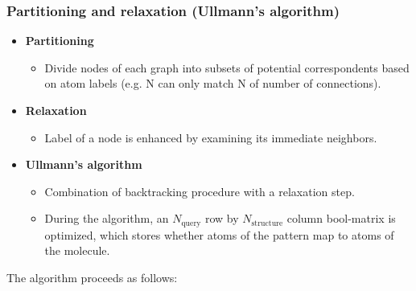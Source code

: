 \subsubsection{Partitioning and relaxation (Ullmann's algorithm)}

\begin{itemize}
    \item \textbf{Partitioning}
    \begin{itemize}
        \item Divide nodes of each graph into subsets of potential correspondents based on atom labels (e.g. N can only match N of number of connections).
    \end{itemize}
    \item \textbf{Relaxation}
    \begin{itemize}
        \item Label of a node is enhanced by examining its immediate neighbors.
    \end{itemize}
    \item \textbf{Ullmann's algorithm}
    \begin{itemize}
        \item Combination of backtracking procedure with a relaxation step.
        \item During the algorithm, an $N_\mathrm{query}$ row by $N_\mathrm{structure}$ column bool-matrix is optimized, which stores whether atoms of the pattern map to atoms of the molecule. 
    \end{itemize}
\end{itemize}

The algorithm proceeds as follows:

